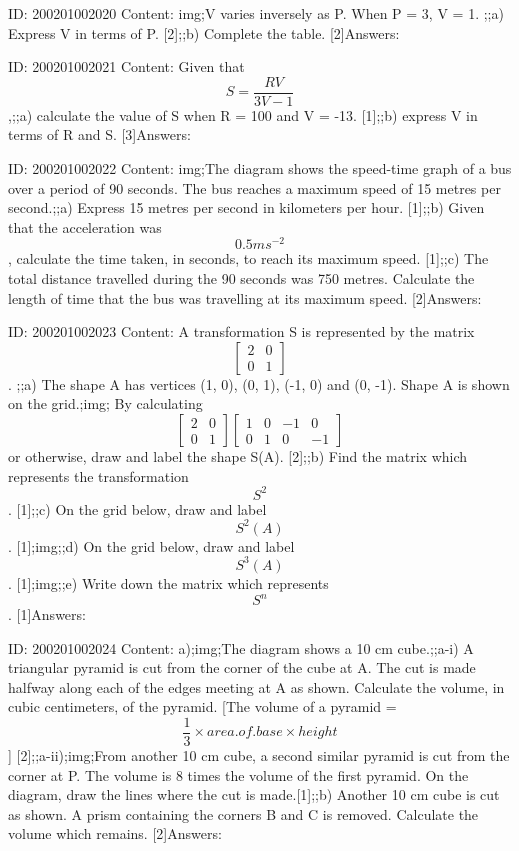 \documentclass{article}
\begin{document}
ID: 200201002020
Content:
img;V varies inversely as P. When P = 3, V = 1. ;;a) Express V in terms of P. [2];;b) Complete the table. [2]Answers:

ID: 200201002021
Content:
Given that $$S = \frac{RV}{3V-1}$$,;;a) calculate the value of S when R = 100 and V = -13. [1];;b) express V in terms of R and S. [3]Answers:

ID: 200201002022
Content:
img;The diagram shows the speed-time graph of a bus over a period of 90 seconds. The bus reaches a maximum speed of 15 metres per second.;;a) Express 15 metres per second in kilometers per hour. [1];;b) Given that the acceleration was $$0.5 ms^{-2} $$, calculate the time taken, in seconds, to reach its maximum speed. [1];;c) The total distance travelled during the 90 seconds was 750 metres. Calculate the length of time that the bus was travelling at its maximum speed. [2]Answers:

ID: 200201002023
Content:
A transformation S is represented by the matrix  $$\begin{bmatrix}2&0\\0&1\end{bmatrix}$$. ;;a) The shape A has vertices (1, 0), (0, 1), (-1, 0) and (0, -1). Shape A is shown on the grid.;img; By calculating $$\begin{bmatrix}2&0\\0&1\end{bmatrix}\begin{bmatrix}1&0&-1&0\\0&1&0&-1\end{bmatrix}$$ or otherwise, draw and label the shape S(A). [2];;b) Find the matrix which represents the transformation $$S^{2} $$. [1];;c) On the grid below, draw and label $$S^{2} (A)$$. [1];img;;d) On the grid below, draw and label $$S^{3} (A)$$. [1];img;;e) Write down the matrix which represents $$S^{n}$$. [1]Answers:

ID: 200201002024
Content:
a);img;The diagram shows a 10 cm cube.;;a-i) A triangular pyramid is cut from the corner of the cube at A. The cut is made halfway along each of the edges meeting at A as shown. Calculate the volume, in cubic centimeters, of the pyramid. [The volume of a pyramid = $$\frac{1}{3} \times area.of.base \times height$$] [2];;a-ii);img;From another 10 cm cube, a second similar pyramid is cut from the corner at P. The volume is 8 times the volume of the first pyramid. On the diagram, draw the lines where the cut is made.[1];;b) Another 10 cm cube is cut as shown. A prism containing the corners B and C is removed. Calculate the volume which remains. [2]Answers:
\end{document}

